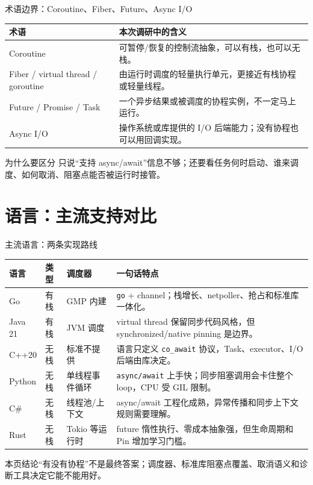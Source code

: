 \documentclass[UTF8,aspectratio=169,11pt]{ctexbeamer}
\newcommand{\takeaway}[1]{\begin{block}{本页结论}#1\end{block}}
\begin{document}
\begin{frame}{术语边界：Coroutine、Fiber、Future、Async I/O}
  \small
  \begin{tabularx}{\linewidth}{l Y}
    \toprule
    术语 & 本次调研中的含义 \\
    \midrule
    Coroutine & 可暂停/恢复的控制流抽象，可以有栈，也可以无栈。 \\
    Fiber / virtual thread / goroutine & 由运行时调度的轻量执行单元，更接近有栈协程或轻量线程。 \\
    Future / Promise / Task & 一个异步结果或被调度的协程实例，不一定马上运行。 \\
    Async I/O & 操作系统或库提供的 I/O 后端能力；没有协程也可以用回调实现。 \\
    \bottomrule
  \end{tabularx}
  \vspace{0.25cm}
  \begin{alertblock}{为什么要区分}
    只说“支持 async/await”信息不够；还要看任务何时启动、谁来调度、如何取消、阻塞点能否被运行时接管。
  \end{alertblock}
\end{frame}

\section{语言：主流支持对比}

\begin{frame}{主流语言：两条实现路线}
  \scriptsize
  \begin{tabularx}{\linewidth}{l l l Y}
    \toprule
    语言 & 类型 & 调度器 & 一句话特点 \\
    \midrule
    Go & 有栈 & GMP 内建 & \texttt{go} + channel；栈增长、netpoller、抢占和标准库一体化。 \\
    Java 21 & 有栈 & JVM 调度 & virtual thread 保留同步代码风格，但 synchronized/native pinning 是边界。 \\
    C++20 & 无栈 & 标准不提供 & 语言只定义 \texttt{co\_await} 协议，Task、executor、I/O 后端由库决定。 \\
    Python & 无栈 & 单线程事件循环 & \texttt{async/await} 上手快；同步阻塞调用会卡住整个 loop，CPU 受 GIL 限制。 \\
    C\# & 无栈 & 线程池/上下文 & async/await 工程化成熟，异常传播和同步上下文规则需要理解。 \\
    Rust & 无栈 & Tokio 等运行时 & future 惰性执行、零成本抽象强，但生命周期和 Pin 增加学习门槛。 \\
    \bottomrule
  \end{tabularx}
  \takeaway{“有没有协程”不是最终答案；调度器、标准库阻塞点覆盖、取消语义和诊断工具决定它能不能用好。}
\end{frame}
\end{document}
